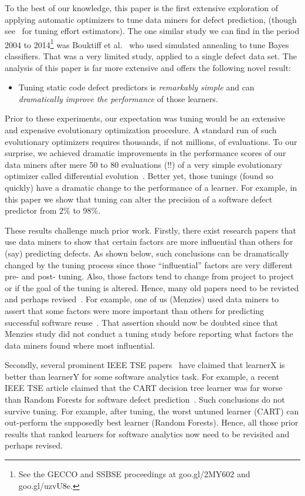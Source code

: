 \documentclass{sig-alternative}
\newcommand{\bi}{\begin{itemize}[leftmargin=0.4cm]}
\newcommand{\ei}{\end{itemize}}
\begin{document}
To the best of our knowledge, this paper is the first extensive exploration 
of applying automatic optimizers to tune data miners for defect prediction,
(though see~\cite{cora10,balogh12,Minku13,minku13z} for tuning effort estimators).
The one similar study  we can find in the period 2004 to 2014\footnote{See the GECCO and SSBSE proceedings at    goo.gl/2MY602 and goo.gl/uzvU8e.} was
Bouktiff et al.~\cite{Bouktif06} who used  simulated annealing to tune Bayes classifiers.
That was a very limited study, applied to a  single defect data set.
The analysis of this paper is far more extensive and offers the following novel result:
\bi
\item
Tuning static code defect predictors is {\em remarkably simple} and can {\em dramatically improve the performance}
of those learners. 
\ei
Prior to these experiments, our expectation was tuning
would be an  extensive and expensive evolutionary optimization procedure. 
A standard run of such evolutionary optimizers requires   thousands,
if not millions, of evaluations.
To
our surprise, we achieved dramatic improvements in the performance scores
of our data miners after  mere 50 to 80 evaluations (!!) of a very simple evolutionary 
optimizer  called differential evolution~\cite{storn1997differential}.
Better yet,  those  tunings (found so quickly)   
  have a dramatic change to the performance of a learner. For example,
in this paper we show that tuning can alter the precision of
a software defect predictor from 2\% to 98\%.

These results challenge much prior work. 
Firstly, there exist research papers
that use data miners to   show that certain factors
are more influential than others for (say)
predicting defects. As shown below, such conclusions can be dramatically
changed by the tuning process since those  ``influential'' factors are very different pre- and post- tuning. Also, those factors tend to  change from project to project or if the goal
of the tuning is altered.
Hence, many old papers    need to be revisted  and perhaps revised~\cite{bell2013limited,rahman2013how,me02k,moser2008comparative,zimmermann2007predicting,herzig2013predicting}.  
For example, one of us (Menzies) used data miners
to assert that some factors were more important than others for predicting
successful software reuse~\cite{me02k}. That assertion should now be doubted since that
Menzies study did not conduct a tuning study before reporting what factors the data miners
found where most influential.

Secondly, several  prominent IEEE TSE papers~\cite{lessmann2008benchmarking,hall11,me07b} have claimed 
that learnerX is better than learnerY for some software analytics task.
For example, a recent IEEE TSE article claimed that the 
CART decision tree learner was far worse than Random Forests for
software defect prediction~\cite{lessmann2008benchmarking}. 
Such conclusions do not survive tuning.
For example,
after tuning, the worst untuned learner (CART) can out-perform the supposedly
best learner (Random Forests). Hence, all those prior results that ranked learners for software
analytics now need to be revisited and perhaps revised.
\end{document}
